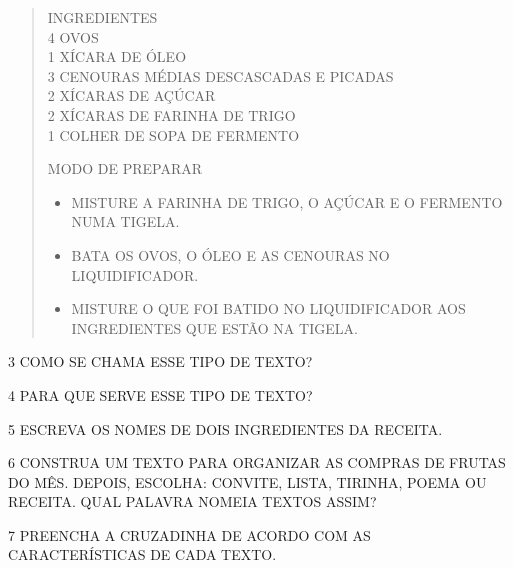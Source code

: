 \begin{quote}
\begin{flushleft}
INGREDIENTES\\
4 OVOS\\
1 XÍCARA DE ÓLEO\\
3 CENOURAS MÉDIAS DESCASCADAS E PICADAS\\
2 XÍCARAS DE AÇÚCAR\\
2 XÍCARAS DE FARINHA DE TRIGO\\
1 COLHER DE SOPA DE FERMENTO

MODO DE PREPARAR

\begin{itemize}
\item
  MISTURE A FARINHA DE TRIGO, O AÇÚCAR E O FERMENTO NUMA TIGELA.

\item
  BATA OS OVOS, O ÓLEO E AS CENOURAS NO LIQUIDIFICADOR.

\item
  MISTURE O QUE FOI BATIDO NO LIQUIDIFICADOR AOS INGREDIENTES QUE ESTÃO NA TIGELA.
\end{itemize}
\end{flushleft}

\end{quote}

\num{3} COMO SE CHAMA ESSE TIPO DE TEXTO?


\num{4} PARA QUE SERVE ESSE TIPO DE TEXTO?


\num{5} ESCREVA OS NOMES DE DOIS INGREDIENTES DA RECEITA.


\pagebreak
\num{6} CONSTRUA UM TEXTO PARA ORGANIZAR AS COMPRAS DE FRUTAS DO MÊS. DEPOIS, ESCOLHA: CONVITE, LISTA, TIRINHA, POEMA OU RECEITA. QUAL PALAVRA NOMEIA TEXTOS ASSIM?


\num{7} PREENCHA A CRUZADINHA DE ACORDO COM AS CARACTERÍSTICAS DE CADA TEXTO.

